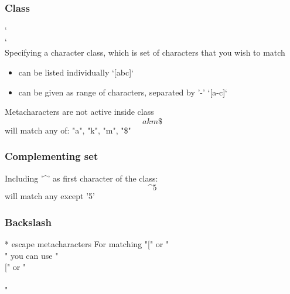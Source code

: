 \documentclass{beamer}
\begin{document}
\subsubsection{Class}
\begin{frame}
`\[ \]` \\
Specifying a character class, which is set of characters that you wish to match
 \begin{itemize}
  \item can be listed individually `[abc]`
  \item can be given as range of characters, separated by '-' `[a-c]`
 \end{itemize}
\pause
Metacharacters are not active inside class \\
\[akm\$\] will match any of: "a", "k", "m", "\$"
\end{frame}

\subsubsection{Complementing set}
\begin{frame}
Including '\textasciicircum{}' as first character of the class: \[\text{\textasciicircum{}5}\] will match any except '5'
\end{frame}

\subsubsection{Backslash}
\begin{frame}
* escape metacharacters
For matching "[" or "\\" you can use "\\[" or "\\\\"
\end{frame}
\end{document}
